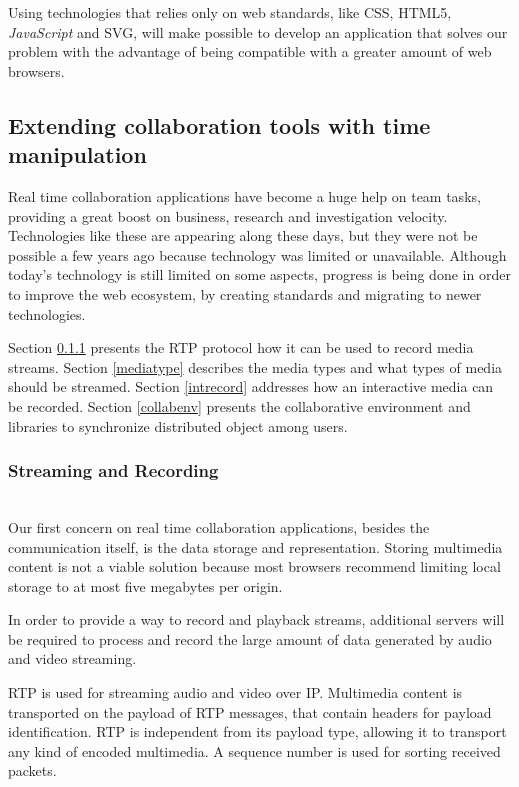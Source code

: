 \documentclass[conference,compsoc,a4paper]{IEEEtran}
\begin{document}
  Using technologies that relies only on web standards, like \gls{CSS}, \gls{HTML}5, \emph{JavaScript} and \gls{SVG}, will make possible to develop an application that solves our problem with the advantage of being compatible with a greater amount of web browsers.
  
\subsection{Extending collaboration tools with time manipulation}
\label{collab}

Real time collaboration applications have become a huge help on team tasks, providing a great boost on business, research and investigation velocity. Technologies like these are appearing along these days, but they were not be possible a few years ago because technology was limited or unavailable. Although today's technology is still limited on some aspects, progress is being done in order to improve the web ecosystem, by creating standards and migrating to newer technologies.

Section \ref{recstream} presents the RTP protocol how it can be used to record media streams. Section \ref{mediatype} describes the media types and what types of media should be streamed. Section \ref{intrecord} addresses how an interactive media can be recorded. Section \ref{collabenv} presents the collaborative environment and libraries to synchronize distributed object among users.

\subsubsection{Streaming and Recording}\label{recstream}~\\

 Our first concern on real time collaboration applications, besides the communication itself, is the data storage and representation. Storing multimedia content is not a viable solution because most browsers recommend limiting local storage to at most five megabytes per origin.

 	In order to provide a way to record and playback streams, additional servers will be required to process and record the large amount of data generated by audio and video streaming.

 \gls{RTP}\cite{rfc3550} is used for streaming audio and video over \gls{IP}.
 Multimedia content is transported on the payload of \gls{RTP} messages, that contain headers for payload identification. \gls{RTP} is independent from its payload type, allowing it to transport any kind of encoded multimedia. A sequence number is used for sorting received packets.
\end{document}
